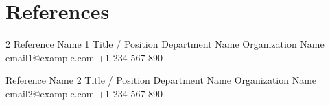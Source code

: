 \documentclass[11pt, a4paper]{article}
\begin{document}
\section{References}
\begin{paracol}{2}
\cvReference
    {Reference Name 1}
    {Title / Position}
    {Department Name}
    {Organization Name}
    {email1@example.com}
    {+1 234 567 890}

\switchcolumn

\cvReference
    {Reference Name 2}
    {Title / Position}
    {Department Name}
    {Organization Name}
    {email2@example.com}
    {+1 234 567 890}
\end{paracol}
\end{document}
